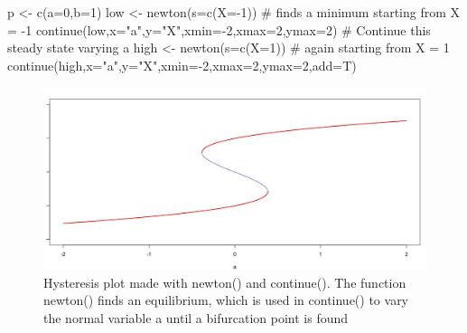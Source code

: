 \documentclass[
  a4paper,
  DIV=11,
  numbers=noendperiod,
  oneside]{scrreprt}
\newenvironment{Shaded}{\begin{snugshade}}{\end{snugshade}}
\newcommand{\AttributeTok}[1]{\textcolor[rgb]{0.40,0.45,0.13}{#1}}
\newcommand{\CommentTok}[1]{\textcolor[rgb]{0.37,0.37,0.37}{#1}}
\newcommand{\DecValTok}[1]{\textcolor[rgb]{0.68,0.00,0.00}{#1}}
\newcommand{\FunctionTok}[1]{\textcolor[rgb]{0.28,0.35,0.67}{#1}}
\newcommand{\NormalTok}[1]{\textcolor[rgb]{0.00,0.23,0.31}{#1}}
\newcommand{\OtherTok}[1]{\textcolor[rgb]{0.00,0.23,0.31}{#1}}
\newcommand{\SpecialCharTok}[1]{\textcolor[rgb]{0.37,0.37,0.37}{#1}}
\newcommand{\StringTok}[1]{\textcolor[rgb]{0.13,0.47,0.30}{#1}}
\begin{document}
\begin{Shaded}
\begin{Highlighting}[]
\NormalTok{p }\OtherTok{\textless{}{-}} \FunctionTok{c}\NormalTok{(}\AttributeTok{a=}\DecValTok{0}\NormalTok{,}\AttributeTok{b=}\DecValTok{1}\NormalTok{)}
\NormalTok{low }\OtherTok{\textless{}{-}} \FunctionTok{newton}\NormalTok{(}\AttributeTok{s=}\FunctionTok{c}\NormalTok{(}\AttributeTok{X=}\SpecialCharTok{{-}}\DecValTok{1}\NormalTok{)) }\CommentTok{\# finds a minimum starting from X = {-}1}
\FunctionTok{continue}\NormalTok{(low,}\AttributeTok{x=}\StringTok{"a"}\NormalTok{,}\AttributeTok{y=}\StringTok{"X"}\NormalTok{,}\AttributeTok{xmin=}\SpecialCharTok{{-}}\DecValTok{2}\NormalTok{,}\AttributeTok{xmax=}\DecValTok{2}\NormalTok{,}\AttributeTok{ymax=}\DecValTok{2}\NormalTok{) }\CommentTok{\# Continue this steady state varying a}
\NormalTok{high }\OtherTok{\textless{}{-}} \FunctionTok{newton}\NormalTok{(}\AttributeTok{s=}\FunctionTok{c}\NormalTok{(}\AttributeTok{X=}\DecValTok{1}\NormalTok{)) }\CommentTok{\# again starting from X = 1}
\FunctionTok{continue}\NormalTok{(high,}\AttributeTok{x=}\StringTok{"a"}\NormalTok{,}\AttributeTok{y=}\StringTok{"X"}\NormalTok{,}\AttributeTok{xmin=}\SpecialCharTok{{-}}\DecValTok{2}\NormalTok{,}\AttributeTok{xmax=}\DecValTok{2}\NormalTok{,}\AttributeTok{ymax=}\DecValTok{2}\NormalTok{,}\AttributeTok{add=}\NormalTok{T)}
\end{Highlighting}
\end{Shaded}

\begin{figure}

{\centering \includegraphics{media/ch4n/image3.jpg}

}

\caption{\label{fig-ch4n-img3-old-51}Hysteresis plot made with newton()
and continue(). The function newton() finds an equilibrium, which is
used in continue() to vary the normal variable a until a bifurcation
point is found}

\end{figure}
\end{document}
